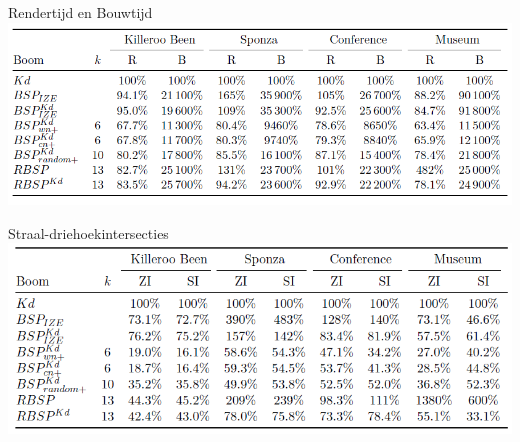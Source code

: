\documentclass[11pt,t]{beamer}
\begin{document}
\begin{frame}[c]{Rendertijd en Bouwtijd}
	\includegraphics[width=.9\paperwidth]{graphics/rendertijd}
\end{frame}

\begin{frame}[c]{Straal-driehoekintersecties}
	\includegraphics[width=.9\paperwidth]{graphics/intersecties}
\end{frame}
\end{document}
